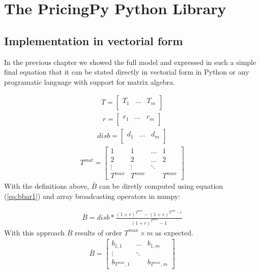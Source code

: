 

\chapter{The PricingPy Python Library}
\section{Implementation in vectorial form}
In the previous chapter we showed the full model and expressed in such a simple final equation that it can be stated directly in vectorial form in Python or any programatic language with support for matrix algebra.

\begin{align}
T = \begin{bmatrix} 
    T_{1} & \dots &  T_{m} \\
    \end{bmatrix}    
\end{align}
\begin{align}
r = \begin{bmatrix} 
    r_{1} & \dots &  r_{m} \\
    \end{bmatrix}    
\end{align}
\begin{align}
disb = \begin{bmatrix} 
    d_{1} & \dots &  d_{m} \\
    \end{bmatrix}    
\end{align}
\begin{align}
T^{mat} = \begin{bmatrix} 
     1 & 1 &\dots &  1 \\
     2 & 2 &\dots &  2 \\
    \vdots & \vdots &\ddots & \\
    T^{max} & T^{max} &       & T^{max}
    \end{bmatrix}       
\end{align}
With the definitions above, $\bar{B}$ can be diretly computed using equation (\ref{eq:bbar1}) and array broadcasting operators in numpy:

\begin{align}
    \bar{B} = disb*\frac{(1+r)^T^{max}-(1+r)^{T^{mat}-1}}{(1+r)^T^{max}-1}
\end{align}
With this approach $\bar{B}$ results of order $T^{max}\times m$ as expected.
\begin{align}
\bar{B} = \begin{bmatrix} 
    b_{1,1} & \dots &  b_{1,m} \\
    \vdots & \ddots & \\
    b_{T^{max},1} &        & b_{T^{max},m} 
    \end{bmatrix}    
\end{align}
